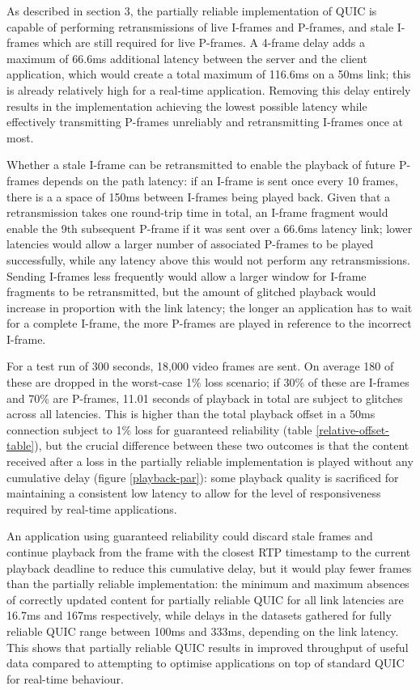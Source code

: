 \documentclass{mpaper}
\begin{document}
As described in section 3, the partially reliable implementation of QUIC is capable of performing retransmissions of live I-frames and P-frames, and stale I-frames which are still required for live P-frames. A 4-frame delay adds a maximum of 66.6ms additional latency between the server and the client application, which would create a total maximum of 116.6ms on a 50ms link; this is already relatively high for a real-time application. Removing this delay entirely results in the implementation achieving the lowest possible latency while effectively transmitting P-frames unreliably and retransmitting I-frames once at most.

Whether a stale I-frame can be retransmitted to enable the playback of future P-frames depends on the path latency: if an I-frame is sent once every 10 frames, there is a a space of 150ms between I-frames being played back. Given that a retransmission takes one round-trip time in total, an I-frame fragment would enable the 9th subsequent P-frame if it was sent over a 66.6ms latency link; lower latencies would allow a larger number of associated P-frames to be played successfully, while any latency above this would not perform any retransmissions. Sending I-frames less frequently would allow a larger window for I-frame fragments to be retransmitted, but the amount of glitched playback would increase in proportion with the link latency; the longer an application has to wait for a complete I-frame, the more P-frames are played in reference to the incorrect I-frame.

For a test run of 300 seconds, 18,000 video frames are sent. On average 180 of these are dropped in the worst-case 1\% loss scenario; if 30\% of these are I-frames and 70\% are P-frames, 11.01 seconds of playback in total are subject to glitches across all latencies. This is higher than the total playback offset in a 50ms connection subject to 1\% loss for guaranteed reliability (table \ref{relative-offset-table}), but the crucial difference between these two outcomes is that the content received after a loss in the partially reliable implementation is played without any cumulative delay (figure \ref{playback-par}): some playback quality is sacrificed for maintaining a consistent low latency to allow for the level of responsiveness required by real-time applications.

An application using guaranteed reliability could discard stale frames and continue playback from the frame with the closest RTP timestamp to the current playback deadline to reduce this cumulative delay, but it would play fewer frames than the partially reliable implementation: the minimum and maximum absences of correctly updated content for partially reliable QUIC for all link latencies are 16.7ms and 167ms respectively, while delays in the datasets gathered for fully reliable QUIC range between 100ms and 333ms, depending on the link latency. This shows that partially reliable QUIC results in improved throughput of useful data compared to attempting to optimise applications on top of standard QUIC for real-time behaviour.
\end{document}
